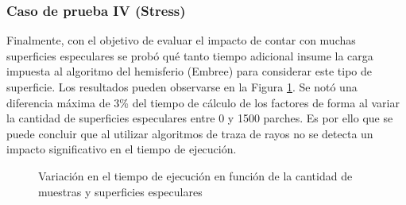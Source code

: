 \subsubsection{Caso de prueba IV (Stress)}

Finalmente, con el objetivo de evaluar el impacto de contar con muchas superficies especulares se probó qué tanto tiempo adicional insume la carga impuesta al algoritmo del hemisferio (Embree) para considerar este tipo de superficie. Los resultados pueden observarse en la Figura \ref{plot:este}. Se notó una diferencia máxima de 3\% del tiempo de cálculo de los factores de forma al variar la cantidad de superficies especulares entre 0 y 1500 parches. Es por ello que se puede concluir que al utilizar algoritmos de traza de rayos no se detecta un impacto significativo en el tiempo de ejecución.

\begin{figure}[htbp!]
\caption{Variación en el tiempo de ejecución en función de la cantidad de muestras y superficies especulares}
\label{plot:este}
\end{figure}

